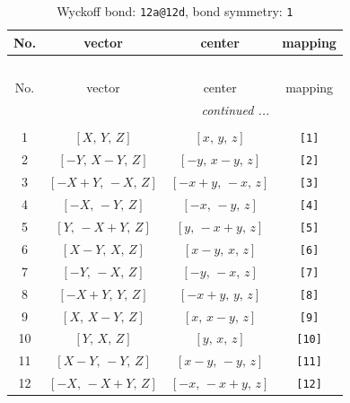 \documentclass[fleqn,8pt]{jsarticle}
\begin{document}
\begin{longtable}{cccc}
\caption{Wyckoff bond: {\tt 12a@12d}, bond symmetry: {\tt 1}}
 \\
 \hline \hline
No. & vector & center & mapping \\ \hline \endfirsthead

\multicolumn{3}{l}{\tablename\ \thetable{}} \\
 \hline \hline
No. & vector & center & mapping \\ \hline \endhead

 \hline \hline
\multicolumn{3}{r}{\footnotesize\it continued ...} \\ \endfoot

 \hline \hline
\multicolumn{3}{r}{} \\ \endlastfoot

1 & $\left[ X,\, Y,\, Z \right]$ & $\left[ x,\, y,\, z \right]$ & {\tt [1]} \\ \hline
2 & $\left[ - Y,\, X - Y,\, Z \right]$ & $\left[ - y,\, x - y,\, z \right]$ & {\tt [2]} \\ \hline
3 & $\left[ - X + Y,\, - X,\, Z \right]$ & $\left[ - x + y,\, - x,\, z \right]$ & {\tt [3]} \\ \hline
4 & $\left[ - X,\, - Y,\, Z \right]$ & $\left[ - x,\, - y,\, z \right]$ & {\tt [4]} \\ \hline
5 & $\left[ Y,\, - X + Y,\, Z \right]$ & $\left[ y,\, - x + y,\, z \right]$ & {\tt [5]} \\ \hline
6 & $\left[ X - Y,\, X,\, Z \right]$ & $\left[ x - y,\, x,\, z \right]$ & {\tt [6]} \\ \hline
7 & $\left[ - Y,\, - X,\, Z \right]$ & $\left[ - y,\, - x,\, z \right]$ & {\tt [7]} \\ \hline
8 & $\left[ - X + Y,\, Y,\, Z \right]$ & $\left[ - x + y,\, y,\, z \right]$ & {\tt [8]} \\ \hline
9 & $\left[ X,\, X - Y,\, Z \right]$ & $\left[ x,\, x - y,\, z \right]$ & {\tt [9]} \\ \hline
10 & $\left[ Y,\, X,\, Z \right]$ & $\left[ y,\, x,\, z \right]$ & {\tt [10]} \\ \hline
11 & $\left[ X - Y,\, - Y,\, Z \right]$ & $\left[ x - y,\, - y,\, z \right]$ & {\tt [11]} \\ \hline
12 & $\left[ - X,\, - X + Y,\, Z \right]$ & $\left[ - x,\, - x + y,\, z \right]$ & {\tt [12]} \\
\end{longtable}
\end{document}
